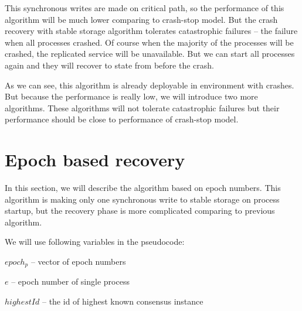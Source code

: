 This synchronous writes are made on critical path, so the performance of this algorithm will be much lower comparing to crash-stop model. But the crash recovery with stable storage algorithm tolerates catastrophic failures -- the failure when all processes crashed. Of course when the majority of the processes will be crashed, the replicated service will be unavailable. But we can start all processes again and they will recover to state from before the crash.

As we can see, this algorithm is already deployable in environment with crashes. But because the performance is really low, we will introduce two more algorithms. These algorithms will not tolerate catastrophic failures but their performance should be close to performance of crash-stop model.

\section{Epoch based recovery}
\label{sec:epoch_ss}

In this section, we will describe the algorithm based on epoch numbers. This algorithm is making only one synchronous write to stable storage on process startup, but the recovery phase is more complicated comparing to previous algorithm.

We will use following variables in the pseudocode:
\begin{tightList}[\setlength{\labelwidth}{20em} \setlength{\leftmargin}{3\leftmargin}]
  \item[$epoch_p$] -- vector of epoch numbers
  \item[$e$] -- epoch number of single process
  \item[$highestId$] -- the id of highest known consensus instance
\end{tightList}


